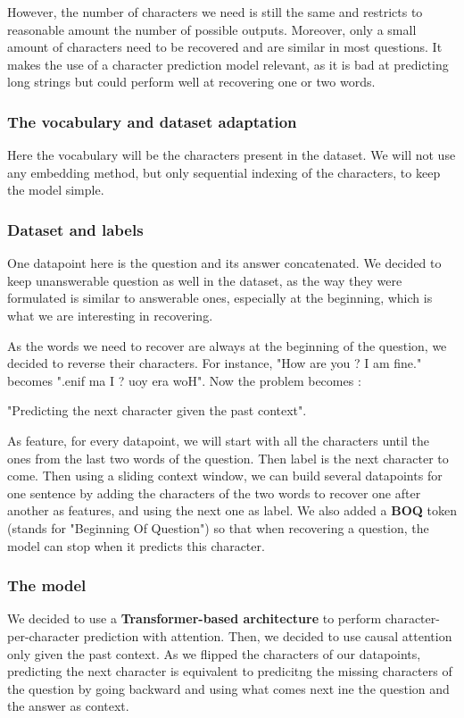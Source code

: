 \documentclass{article}
\begin{document}
However, the number of characters we need is still the same and restricts to reasonable amount the number of possible outputs. Moreover, only a small amount of characters need to be recovered and are similar in most questions. It makes the use of a character prediction model relevant, as it is bad at predicting long strings but could perform well at recovering one or two words.

\subsubsection{The vocabulary and dataset adaptation}
Here the vocabulary will be the characters present in the dataset. We will not use any embedding method, but only sequential indexing of the characters, to keep the model simple. 

\subsubsection{Dataset and labels}
One datapoint here is the question and its answer concatenated. We decided to keep unanswerable question as well in the dataset, as the way they were formulated is similar to answerable ones, especially at the beginning, which is what we are interesting in recovering. \newline

As the words we need to recover are always at the beginning of the question, we decided to reverse their characters. For instance, "How are you ? I am fine." becomes ".enif ma I ? uoy era woH". Now the problem becomes :

"Predicting the next character given the past context".

As feature, for every datapoint, we will start with all the characters until the ones from the last two words of the question. Then label is the next character to come. Then using a sliding context window, we can build several datapoints for one sentence by adding the characters of the two words to recover one after another as features, and using the next one as label. We also added a \textbf{BOQ} token (stands for "Beginning Of Question") so that when recovering a question, the model can stop when it predicts this character.

\subsubsection{The model}
We decided to use a \textbf{Transformer-based architecture} to perform character-per-character prediction with attention. 
Then, we decided to use causal attention only given the past context. As we flipped the characters of our datapoints, predicting the next character is equivalent to predicitng the missing characters of the question by going backward and using what comes next ine the question and the answer as context.
\end{document}
